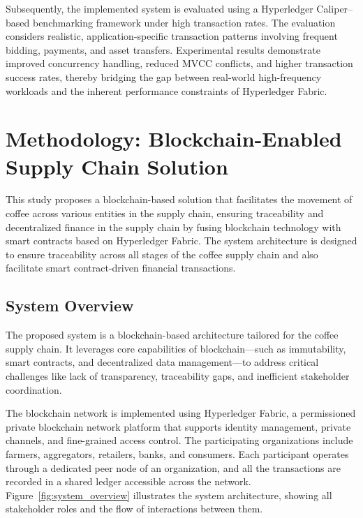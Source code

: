 \documentclass[12pt]{article}
\begin{document}
	Subsequently, the implemented system is evaluated using a Hyperledger Caliper–based benchmarking framework under high transaction rates. The evaluation considers realistic, application-specific transaction patterns involving frequent bidding, payments, and asset transfers. Experimental results demonstrate improved concurrency handling, reduced MVCC conflicts, and higher transaction success rates, thereby bridging the gap between real-world high-frequency workloads and the inherent performance constraints of Hyperledger Fabric.
	
	
	
	
	\section{Methodology: Blockchain-Enabled Supply Chain Solution}
	
	This study proposes a blockchain-based solution that facilitates the movement of coffee across various entities in the supply chain, ensuring traceability and decentralized finance in the supply chain by fusing blockchain technology with smart contracts based on Hyperledger Fabric. The system architecture is designed to ensure traceability across all stages of the coffee supply chain and also facilitate smart contract-driven financial transactions.
	
	
	
	\subsection{System Overview}
	
	The proposed system is a blockchain-based architecture tailored for the coffee supply chain. It leverages core capabilities of blockchain—such as immutability, smart contracts, and decentralized data management—to address critical challenges like lack of transparency, traceability gaps, and inefficient stakeholder coordination.
	
	The blockchain network is implemented using Hyperledger Fabric, a permissioned private blockchain network platform that supports identity management, private channels, and fine-grained access control. The participating organizations include farmers, aggregators, retailers, banks, and consumers. Each participant operates through a dedicated peer node of an organization, and all the transactions are recorded in a shared ledger accessible across the network. Figure~\ref{fig:system_overview} illustrates the system architecture, showing all stakeholder roles and the flow of interactions between them.
	
\end{document}
